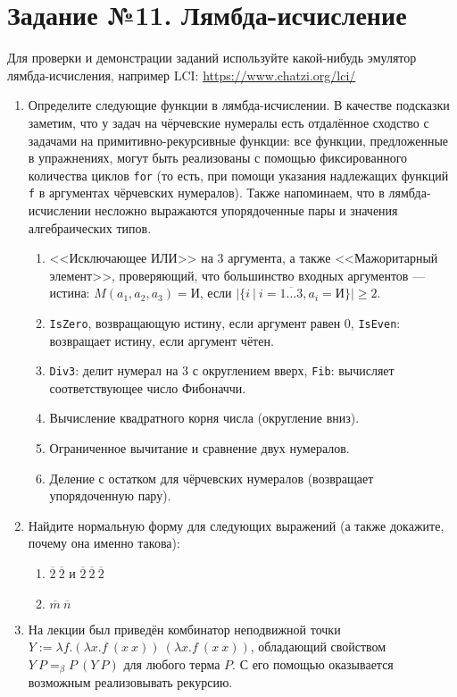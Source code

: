 \documentclass[10pt,a4paper,oneside]{article}
\begin{document}
\section*{Задание №11. Лямбда-исчисление}
Для проверки и демонстрации заданий используйте какой-нибудь эмулятор лямбда-исчисления,
например LCI: \url{https://www.chatzi.org/lci/}

\begin{enumerate}
\item Определите следующие функции в лямбда-исчислении. В качестве подсказки заметим, что у задач на чёрчевские
нумералы есть отдалённое сходство с задачами на примитивно-рекурсивные функции: все функции, предложенные 
в упражнениях, могут быть реализованы с помощью фиксированного количества циклов \verb!for! (то есть, при помощи 
указания надлежащих функций \verb!f! в аргументах чёрчевских нумералов). Также напоминаем, что в лямбда-исчислении
несложно выражаются упорядоченные пары и значения алгебраических типов.
\begin{enumerate}
\item <<Исключающее ИЛИ>> на 3 аргумента, а также <<Мажоритарный элемент>>, проверяющий, что большинство 
входных аргументов --- истина: $M(a_1,a_2,a_3) = \text{И}$, если $|\{i\ |\ i=\overline{1\dots 3}, a_i = \text{И}\}| \ge 2$.
\item \verb!IsZero!, возвращающую истину, если аргумент равен 0,
\verb!IsEven!: возвращает истину, если аргумент чётен.
\item \verb!Div3!: делит нумерал на 3 с округлением вверх, \verb!Fib!: вычисляет соответствующее число Фибоначчи.
\item Вычисление квадратного корня числа (округление вниз).
\item Ограниченное вычитание и сравнение двух нумералов.
\item Деление с остатком для чёрчевских нумералов (возвращает упорядоченную пару).
\end{enumerate}

\item Найдите нормальную форму для следующих выражений (а также докажите, почему она именно такова):
\begin{enumerate}
\item $\overline{2}\ \overline{2}$ и $\overline{2}\ \overline{2}\ \overline{2}$
\item $\overline{m}\ \overline{n}$
\end{enumerate}

\item На лекции был приведён комбинатор неподвижной точки $Y := \lambda f.(\lambda x.f\ (x\ x))\ (\lambda x.f\ (x\ x))$, обладающий свойством
$Y\ P =_\beta P\ (Y\ P)$ для любого терма $P$. С его помощью оказывается возможным реализовывать рекурсию.


\end{enumerate}
\end{document}
